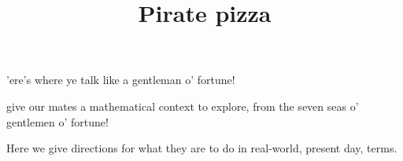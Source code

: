 \documentclass{article}
\title{Pirate pizza}
\begin{document}
\begin{context}
  'ere's where ye talk like a gentleman o' fortune!

  give our mates a mathematical context to explore, from the seven seas o' gentlemen o' fortune!
\end{context}

\begin{directions}
  Here we give directions for what they are to do in real-world, present day, terms. 
\end{directions}



\maketitle
\end{document}
